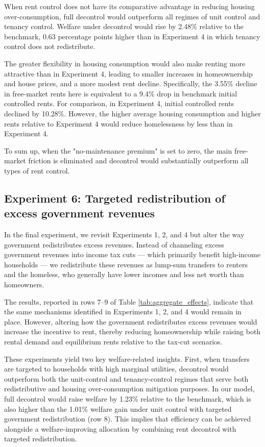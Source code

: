 \documentclass[parskip=full]{article}
\begin{document}
When rent control does not have its comparative advantage in reducing housing over-consumption, full decontrol would outperform all regimes of unit control and tenancy control. Welfare under decontrol would rise by 2.48\% relative to the benchmark, 0.63 percentage points higher than in Experiment 4 in which tenancy control does not redistribute. 

The greater flexibility in housing consumption would also make renting more attractive than in Experiment 4, leading to smaller increases in homeownership and house prices, and a more modest rent decline. Specifically, the 3.55\% decline in free-market rents here is equivalent to a 9.4\% drop in benchmark initial controlled rents. For comparison, in Experiment 4, initial controlled rents declined by 10.28\%. However, the higher average housing consumption and higher rents relative to Experiment 4 would reduce homelessness by less than in Experiment 4. 

To sum up, when the "no-maintenance premium" is set to zero, the main free-market friction is eliminated and decontrol would substantially outperform all types of rent control. 

\subsection{Experiment 6: Targeted redistribution of excess government revenues}\label{sec:exp_6}

In the final experiment, we revisit Experiments 1, 2, and 4 but alter the way government redistributes excess revenues. Instead of channeling excess government revenues into income tax cuts — which primarily benefit high-income households — we redistribute these revenues as lump-sum transfers to renters and the homeless, who generally have lower incomes and less net worth than homeowners. 

The results, reported in rows 7--9 of Table \ref{tab:aggregate_effects}, indicate that the same mechanisms identified in Experiments 1, 2, and 4 would remain in place. However, altering how the government redistributes excess revenues would increase the incentive to rent, thereby reducing homeownership while raising both rental demand and equilibrium rents relative to the tax-cut scenarios.

These experiments yield two key welfare-related insights. First, when transfers are targeted to households with high marginal utilities, decontrol would outperform both the unit-control and tenancy-control regimes that serve both redistributive and housing over-consumption mitigation purposes. In our model, full decontrol would raise welfare by 1.23\% relative to the benchmark, which is also higher than the 1.01\% welfare gain under unit control with targeted government redistribution (row 8). This implies that efficiency can be achieved alongside a welfare-improving allocation by combining rent decontrol with targeted redistribution. 
\end{document}
